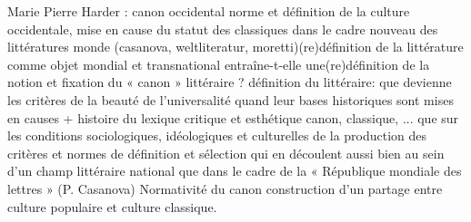 Marie Pierre Harder : canon occidental norme et définition de la culture occidentale, mise en cause du statut des classiques dans le cadre nouveau des littératures monde (casanova, weltliteratur, moretti)(re)définition de la littérature comme objet mondial et transnational entraîne-t-elle une(re)définition de la notion et fixation du « canon » littéraire ? définition du littéraire: que devienne les critères de la beauté de l'universalité quand leur bases historiques sont mises en causes + histoire du lexique critique et esthétique canon, classique, ... que sur les conditions sociologiques, idéologiques et culturelles de la production des critères et normes de définition et sélection qui en découlent aussi bien au sein d’un champ littéraire national que dans le cadre de la « République mondiale des lettres » (P. Casanova) Normativité du canon construction d'un partage entre culture populaire et culture classique.

 